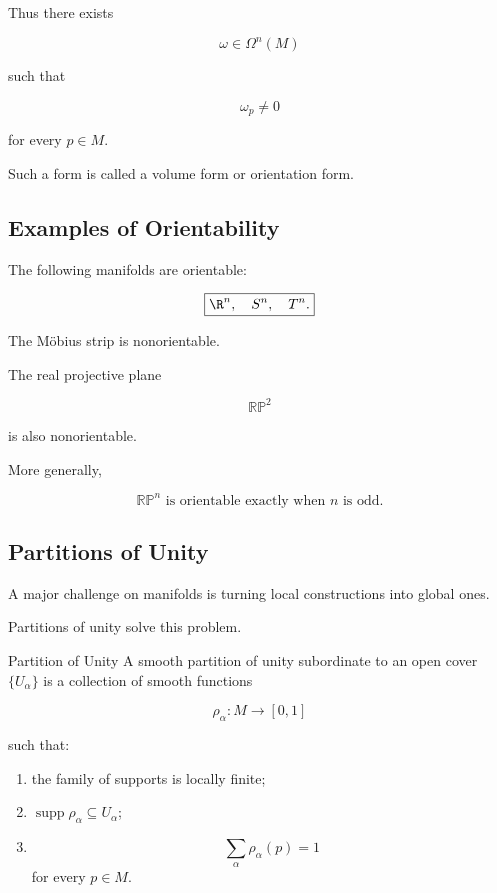 Thus there exists

\[
\boxed{
\omega\in\Omega^n(M)
}
\]

such that

\[
\boxed{
\omega_p\neq0
}
\]

for every \(p\in M\).

Such a form is called a volume form or orientation form.

\subsection{Examples of Orientability}
\label{subsec:examples-orientability-manifolds}

The following manifolds are orientable:

\[
\boxed{
\R^n,
\quad
S^n,
\quad
T^n.
}
\]

The M\"obius strip is nonorientable.

The real projective plane

\[
\boxed{
\mathbb{RP}^2
}
\]

is also nonorientable.

More generally,

\[
\boxed{
\mathbb{RP}^n
\text{ is orientable exactly when }n\text{ is odd}.
}
\]

\subsection{Partitions of Unity}
\label{subsec:partitions-of-unity-manifolds}

A major challenge on manifolds is turning local constructions into global
ones.

Partitions of unity solve this problem.

\begin{definitionbox}{Partition of Unity}
A smooth partition of unity subordinate to an open cover
\(\{U_\alpha\}\) is a collection of smooth functions

\[
\boxed{
\rho_\alpha:M\to[0,1]
}
\]

such that:

\begin{enumerate}
    \item the family of supports is locally finite;
    \item \(\operatorname{supp}\rho_\alpha\subseteq U_\alpha\);
    \item
    \[
    \boxed{
    \sum_\alpha\rho_\alpha(p)=1
    }
    \]
    for every \(p\in M\).
\end{enumerate}
\end{definitionbox}


